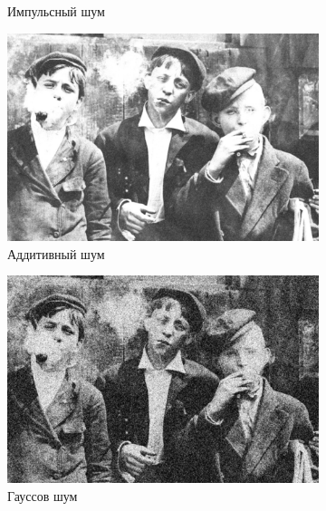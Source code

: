 \begin{figure}[ht!]
\begin{subfigure}[b]{0.5\linewidth}
      \caption{Импульсный шум} 
      \label{gaussian_3:b} 
      \vspace{4ex}
    \end{subfigure}
    \begin{subfigure}[b]{0.5\linewidth}
      \centering
      \includegraphics[width=0.95\linewidth]{../Gaussian_Blur/Gaussian_Blur_Additive_noise_(3,3).jpg} 
      \caption{Аддитивный шум} 
      \label{gaussian_3:c} 
      \vspace{4ex}
    \end{subfigure}%
    \begin{subfigure}[b]{0.5\linewidth}
      \centering
      \includegraphics[width=0.95\linewidth]{../Gaussian_Blur/Gaussian_Blur_Gaussian_noise_(3,3).jpg} 
      \caption{Гауссов шум} 
      \label{gaussian_3:d} 
      \vspace{4ex}
    \end{subfigure}
    \begin{subfigure}[b]{0.5\linewidth}

\end{subfigure}
\end{figure}
